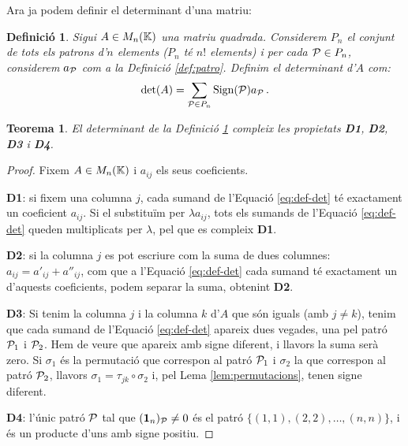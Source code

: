 \documentclass[
  11pt,
]{book}
\numberwithin{dummy}{section}
\theoremstyle{maincolornumbox}
\newtheorem{theorem}{TTTT}[chapter]
\newtheorem{theoremeT}{Teorema}[chapter]
\theoremstyle{blacknumex}
\theoremstyle{blacknumbox}
\newtheorem{definitionT}{Definició}[chapter]
\theoremstyle{maincolornum}
\renewenvironment{theorem}{\begin{tBox}\begin{theoremeT}}{\end{theoremeT}\end{tBox}}
\newenvironment{definition}{\begin{dBox}\begin{definitionT}}{\end{definitionT}\end{dBox}}
\newlength\esp
\begin{document}
Ara ja podem definir el determinant d'una matriu:

\begin{definition}
\protect\hypertarget{def:determinant}{}\label{def:determinant}Sigui \(A\in M_n(\mathbb{K})\) una
matriu quadrada. Considerem \(P_n\) el conjunt de tots els patrons d'\(n\)
elements (\(P_n\) té \(n!\) elements) i per cada \(\mathcal{P}\in P_n\), considerem
\(a_{\mathcal{P}}\) com a la Definició
\ref{def:patro}.
Definim el \emph{determinant d'\(A\)} com: \begin{align*}
 \label{eq:def-det}
    \det(A)=\sum_{\mathcal{P} \in P_n} \operatorname{Sign}(\mathcal{P}) a_{\mathcal{P}} \,.
\end{align*}
\end{definition}

\begin{theorem}
El determinant de la Definició
\ref{def:determinant} compleix les propietats \textbf{D1}, \textbf{D2},
\textbf{D3} i \textbf{D4}.
\end{theorem}

\begin{proof}
Fixem \(A\in M_n(\mathbb{K})\) i \(a_{ij}\) els seus coeficients.

\textbf{D1}: si fixem una columna \(j\), cada sumand de l'Equació
\eqref{eq:def-det} té exactament un coeficient \(a_{ij}\). Si el
substituïm per \(\lambda a_{ij}\), tots els sumands de l'Equació
\eqref{eq:def-det} queden multiplicats per \(\lambda\), pel que es
compleix \textbf{D1}.

\textbf{D2}: si la columna \(j\) es pot escriure com la suma de dues columnes:
\(a_{ij}=a'_{ij}+a''_{ij}\), com que a l'Equació
\eqref{eq:def-det} cada sumand té exactament un d'aquests
coeficients, podem separar la suma, obtenint \textbf{D2}.

\textbf{D3}: Si tenim la columna \(j\) i la columna \(k\) d'\(A\) que són iguals
(amb \(j\neq k\)), tenim que cada sumand de l'Equació
\eqref{eq:def-det} apareix dues vegades, una pel patró \(\mathcal{P}_1\) i
\(\mathcal{P}_2\). Hem de veure que apareix amb signe diferent, i llavors la
suma serà zero. Si \(\sigma_1\) és la permutació que correspon al patró
\(\mathcal{P}_1\) i \(\sigma_2\) la que correspon al patró \(\mathcal{P}_2\), llavors
\(\sigma_1=\tau_{jk}\circ\sigma_2\) i, pel Lema
\ref{lem:permutacions}, tenen signe diferent.

\textbf{D4}: l'únic patró \(\mathcal{P}\) tal que \((\mathbf{1}_n)_{\mathcal{P}}\neq 0\) és el patró
\(\{(1,1),(2,2),\dots, (n,n)\}\), i és un producte d'uns amb signe
positiu.
\end{proof}
\end{document}
